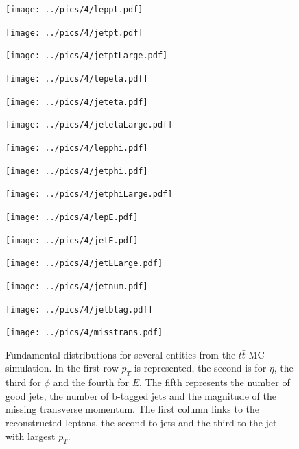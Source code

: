 \begin{figure}[H]
\begin{minipage}{0.32\textwidth}
 \texttt{[image: ../pics/4/leppt.pdf]}
\end{minipage}
\begin{minipage}{0.32\textwidth}
 \texttt{[image: ../pics/4/jetpt.pdf]}
\end{minipage}
\begin{minipage}{0.32\textwidth}
 \texttt{[image: ../pics/4/jetptLarge.pdf]}
\end{minipage}
\begin{minipage}{0.32\textwidth}
 \texttt{[image: ../pics/4/lepeta.pdf]}
\end{minipage}
\begin{minipage}{0.32\textwidth}
 \texttt{[image: ../pics/4/jeteta.pdf]}
\end{minipage}
\begin{minipage}{0.32\textwidth}
 \texttt{[image: ../pics/4/jetetaLarge.pdf]}
\end{minipage}
\begin{minipage}{0.32\textwidth}
 \texttt{[image: ../pics/4/lepphi.pdf]}
\end{minipage}
\begin{minipage}{0.32\textwidth}
 \texttt{[image: ../pics/4/jetphi.pdf]}
\end{minipage}
\begin{minipage}{0.32\textwidth}
 \texttt{[image: ../pics/4/jetphiLarge.pdf]}
\end{minipage}
\begin{minipage}{0.32\textwidth}
 \texttt{[image: ../pics/4/lepE.pdf]}
\end{minipage}
\begin{minipage}{0.32\textwidth}
 \texttt{[image: ../pics/4/jetE.pdf]}
\end{minipage}
\begin{minipage}{0.32\textwidth}
 \texttt{[image: ../pics/4/jetELarge.pdf]}
\end{minipage}
\begin{minipage}{0.32\textwidth}
 \texttt{[image: ../pics/4/jetnum.pdf]}
\end{minipage}
\begin{minipage}{0.32\textwidth}
 \texttt{[image: ../pics/4/jetbtag.pdf]}
\end{minipage}
\begin{minipage}{0.32\textwidth}
 \texttt{[image: ../pics/4/misstrans.pdf]}
\end{minipage}
\caption{\small{Fundamental distributions for several entities from the $t\bar t$ MC simulation. In the first row $p_T$ is represented, the second is for $\eta$, the third for $\phi$ and
the fourth for $E$. The fifth represents the number of good jets, the number of b-tagged jets and the magnitude of the missing transverse momentum.
The first column links to the reconstructed leptons, the second to jets and the third to the jet with largest $p_T$.}}
\label{pic:fundamental}
\end{figure}\noindent

